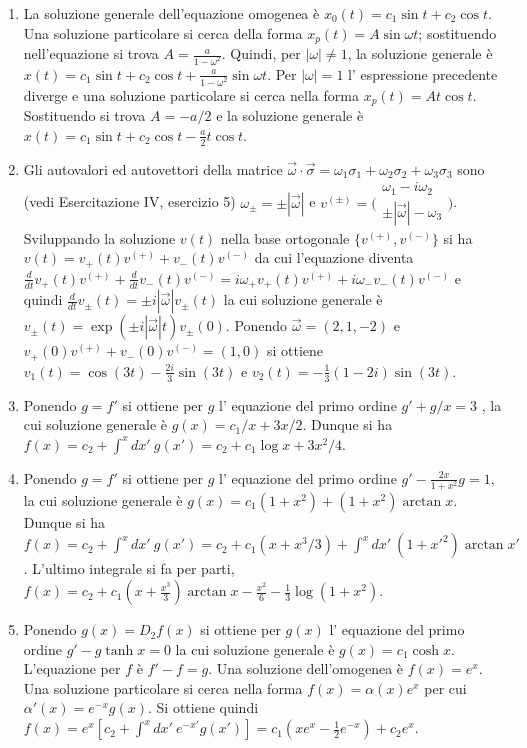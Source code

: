 \documentclass[a4paper,10pt]{article}
\begin{document}
\begin{enumerate}
\item La soluzione generale dell'equazione omogenea \`e
$x_0(t) = c_1 \sin t + c_2 \cos t$. Una soluzione particolare si cerca
della forma $x_p(t) = A \sin \omega t$; sostituendo nell'equazione si
trova $A=\frac{a}{1-\omega^2}$. Quindi, per $|\omega|\neq 1$, la soluzione
generale \`e 
$x(t) = c_1 \sin t + c_2 \cos t + \frac{a}{1-\omega^2} \sin \omega t$.
Per $|\omega|=1$ l' espressione precedente diverge e una soluzione particolare
si cerca nella forma $x_p(t) = A t \cos t$. Sostituendo si trova $A=-a/2$
e la soluzione generale \`e
$x(t) = c_1 \sin t + c_2 \cos t - \frac{a}{2} t \cos t$.
\item Gli autovalori ed autovettori della matrice $\vec{\omega}\cdot \vec{\sigma}= \omega_1 \sigma_1+\omega_2 \sigma_2 +\omega_3 \sigma_3$ sono (vedi Esercitazione IV, esercizio 5) $\omega_{\pm}=\pm |\vec{\omega}|$ e $v^{(\pm)}= \bigl(\begin{smallmatrix}\omega_1-i\omega_2\\ \pm|\vec{\omega}|-\omega_3\end{smallmatrix}\bigr)$. Sviluppando la soluzione $v(t)$ nella base ortogonale $\{v^{(+)}, v^{(-)}\}$ si ha $v(t)= v_{+}(t) v^{(+)} + v_{-}(t) v^{(-)}$ da cui l'equazione diventa $\frac{d}{dt}v_{+}(t) v^{(+)} + \frac{d}{dt}v_{-}(t) v^{(-)}=i\omega_+v_{+}(t) v^{(+)} + i\omega_- v_{-}(t) v^{(-)}$ e quindi $\frac{d}{dt}v_{\pm}(t)= \pm i |\vec{\omega}| v_{\pm}(t)$ la cui soluzione generale \`e $v_{\pm}(t)=\exp( \pm i |\vec{\omega}| t) v_{\pm}(0)$. Ponendo $\vec{\omega}=(2,1,-2)$ e $v_{+}(0) v^{(+)} + v_{-}(0) v^{(-)}=(1,0)$ si ottiene $v_1(t)=\cos(3t) -\frac{2i}{3} \sin(3t)$ e $v_2(t)=-\frac13 (1-2i)\sin(3t)$.

\item Ponendo $g=f'$ si ottiene per $g$ l' equazione del primo ordine  $g'+g/x = 3$ , la cui soluzione generale \`e 
$g(x)=c_1/x + 3x/2$. Dunque si ha 
$f(x) = c_2 + \int^x dx' \ g(x')= c_2 + c_1 \log x + 3x^2/4$.
\item Ponendo $g=f'$ si ottiene per $g$ l' equazione del primo ordine $g'-\frac{2x}{1+x^2}g = 1$, la cui soluzione generale \`e 
$g(x)=c_1 (1+x^2) + (1+x^2) \arctan x$. Dunque si ha 
$f(x) = c_2 + \int^x dx' \ g(x')= c_2 + c_1 (x+ x^3/3) + 
\int^x dx' \ (1+x'^2) \arctan x'$. L'ultimo integrale si fa per parti, $f(x)=c_2+c_1(x+\frac{x^3}{3})\arctan x -\frac{x^2}{6} -\frac13 \log(1+x^2)$.
\item Ponendo $g(x)=D_2 f(x)$ si ottiene per $g(x)$ l' equazione del primo ordine  $g' - g \tanh x = 0$ la cui soluzione generale \`e
$g(x) = c_1 \cosh x $. L'equazione per $f$
\`e $f' - f = g$. Una soluzione dell'omogenea \`e $f(x)=e^x$.
Una soluzione particolare si cerca nella forma $f(x) = \alpha(x) e^x$ per
cui $\alpha'(x) = e^{-x} g(x)$. Si ottiene quindi
$f(x) = e^x [ c_2 + \int^x dx' \ e^{-x'} g(x') ]= c_1(xe^x-\frac12 e^{-x})+c_2 e^x$. 
\end{enumerate}
\end{document}
